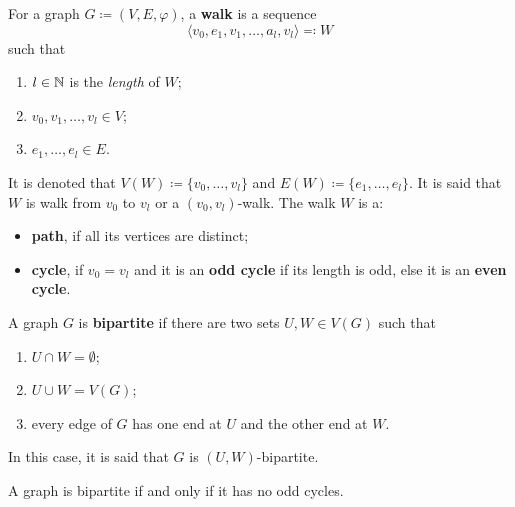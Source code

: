 \begin{definition}[Walk]
	\label{def:walk}
	For a graph \(G \coloneqq (V, E, \varphi)\), a \textbf{walk} is a sequence
	\[
		\langle v_0, e_1, v_1, \dots, a_l, v_l \rangle \eqqcolon W
	\]
	such that
	\begin{enumerate}[label=(\roman*)]
		\item \(l \in \mathbb{N}\) is the \textit{length} of \(W\);
		\item \(v_0, v_1, \dots, v_l \in V\);
		\item \(e_1, \dots, e_l \in E\).
	\end{enumerate}
	It is denoted that \(V(W) 
	\coloneqq \{v_0, \dots, v_l\}\) 
	and 
	\(E(W) \coloneqq \{e_1, \dots, e_l\}\). 
	It is said that \(W\) is walk from \(v_0\) to \(v_l\) or a \((v_0, v_l)\)-walk.
	The walk \(W\) is a:
	\begin{itemize}
		\item 
			\textbf{path}, if all its vertices are distinct;
		\item 
			\textbf{cycle}, if \(v_0 = v_l\) 
			and it is an \textbf{odd cycle} if its length is odd, else it is an \textbf{even cycle}.
	\end{itemize}
\end{definition}

\begin{definition}
	A graph \(G\) is \textbf{bipartite} if there are two sets \(U, W \in V(G)\) such that 
	\begin{enumerate}[label=(\roman*)]
		\item \(U \cap W = \emptyset\);
		\item \(U \cup W = V(G)\);
		\item every edge of \(G\) has one end at \(U\) and the other end at \(W\).
	\end{enumerate}
	In this case, it is said that \(G\) is \((U, W)\)-bipartite.
\end{definition}

\begin{theorem}
	A graph is bipartite if and only if it has no odd cycles.
\end{theorem}

